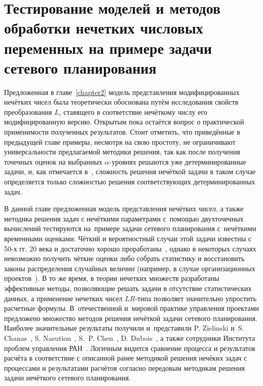 \chapter{Тестирование моделей и методов обработки нечетких числовых переменных на примере задачи сетевого планирования}
\label{chapter3}

Предложенная в главе~\ref{chapter2} модель представления модифицированных нечётких чисел была теоретически обоснована путём исследования свойств преобразования $L$, ставящего в соответствие нечёткому числу его модифицированную версию. Открытым пока остаётся вопрос о практической применимости полученных результатов. Стоит отметить, что приведённые в предыдущей главе примеры, несмотря на свою простоту, не ограничивают универсальности предлагаемой методики решения, так как после получения точечных оценок на выбранных $\alpha$-уровнях решаются уже детерминированные задачи, и, как отмечается в~\cite{Lebedev}, сложность решения нечёткой задачи в таком случае определяется только сложностью решения соответствующих детерминированных задач.

В данной главе предложенная модель представления нечётких чисел, а также методика решения задач с нечёткими параметрами с~помощью двухточечных вычислений тестируются на~примере задачи сетевого планирования с~нечёткими временными оценками. Чёткий и вероятностный случаи этой задачи известны с 50-х гг. 20 века и достаточно хорошо проработаны~\cite{Eddous}, однако в некоторых случаях невозможно получить чёткие оценки либо собрать статистику и восстановить законы распределения случайных величин (например, в случае организационных проектов~\cite{Balashov_IPU}). В то же время, в теории нечетких множеств разработаны эффективные методы, позволяющие решать задачи в отсутствие статистических данных, а применение нечетких чисел $LR$-типа позволяет значительно упростить расчетные формулы. В~отечественной и~мировой практике управления проектами предложено множество методов решения нечёткой задачи сетевого планирования. Наиболее значительные результаты получили и~представили P. Zielinski и~S. Chanas~\cite{Chanas_Zielinski_Criticality, Zielinski_Preprint}, S. Nasution~\cite{Leondes}, S.~P. Chen~\cite{Chen_CPM, Chinese_CPM}, D. Dubois~\cite{Dubois_Prade}, а также сотрудники Института проблем управления РАН~\cite{Balashov_IPU}. Логичным видится сравнение процесса и результатов расчёта в соответствие с описанной ранее методикой решения нечёких задач с процессами и результатами расчётов согласно передовым методикам решения задачи нечёткого сетевого планирования.

